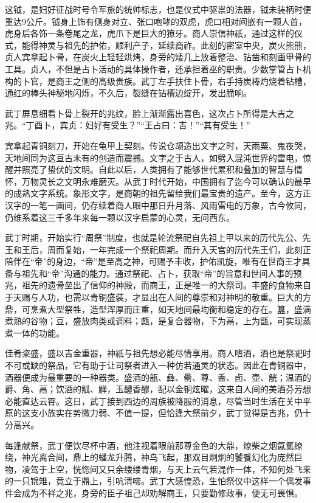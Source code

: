 这钺，是妇好征战时号令军旅的统帅标志，也是仪式中驱祟的法器，钺未装柄时便重达9公斤。钺身上饰有侧身对立、张口咆哮的双虎，虎口相对间嵌有一颗人首，虎身后各饰一条卷尾之龙，虎爪下是巨大的獠牙。商人崇信神祇，通过这样的仪式，能得神灵与祖先的护佑，顺利产子，延续商祚。此刻的密室中央，炭火熊熊，贞人宾拿起卜骨，在炭火上轻轻烘烤，身旁的矮几上放着整治、钻凿和刻画甲骨的工具。贞人，不但是占卜活动的具体操作者，还承担着巫的职责。少数掌管占卜机构的卜官，是商王之侧的高级贵族。武丁左手扶住卜骨，右手持炭棒灼烧着钻槽，通红的棒头神秘地闪烁，不久后，裂缝在钻槽边绽开，发出脆响。

武丁屏息细看卜骨上裂开的兆纹，脸上渐渐露出喜色，这次占卜所得是大吉之兆。“丁酉卜，宾贞：妇好有受生？”“王占曰：吉！”“其有受生！”

宾拿起青铜刻刀，开始在龟甲上契刻。传说仓颉造出文字之时，天雨粟、鬼夜哭，天地间同为这亘古未有的创造而震撼。文字之于古人，如劈入混沌世界的雷电，惊醒并照亮了蛰伏的文明。自此以后，人类拥有了能够世代累积和叠加的智慧与情怀，万物灵长之文明永难磨灭。从武丁时代开始，中国拥有了迄今可以确认的最早的成熟文字系统。象形文字，是商朝的祖先留给我们最宝贵的遗产。至今，这方正汉字的一笔一画间，仍存续着商人眼中那日升月落、风雨雷电的万象，古今攸同，仍维系着这三千多年来每一颗以汉字启蒙的心灵，无问西东。

武丁时期，开始实行“周祭”制度，也就是轮流祭祀自先祖上甲以来的历代先公、先王和王后，周而复始，一年完成一个祭祀周期。而升入天宫的历代先王们，此刻正陪伴在“帝”的身边，“帝”是至高之神，可赐予丰收，护佑凯旋，唯有在世商王才具备与祖先和“帝”沟通的能力。通过祭祀、占卜，获取“帝”的旨意和世间人事的预兆，祖先的遗骨垒出了信仰的神殿，而商王，正是唯一的大祭司。丰盛的食物来自于天赐与人功，也需以青铜盛装，才显出在人间的尊崇和对神明的敬重。巨大的方鼎，可烹煮大型祭牲，造型浑厚而庄重，如天地间最均衡和稳定的存在。簋，盛满煮熟的谷物；豆，盛放肉类或调料；甗，是复合器物，下为鬲，上为甑，可实现蒸煮一体的功能。

佳肴粢盛，盛以吉金重器，神祇与祖先想必能尽情享用。商人嗜酒，酒也是祭祀时不可或缺的祭品，它有助于让司祭者进入一种仿若通灵的状态。因此在青铜器中，酒器便成为最重要的一种器类。盛酒的瓿、彝、罍、尊、盉、卣、壶、觥；温酒的爵、角、鬲；饮酒的觚、觯，玉醴香醪，配以金铜炫曜，这来自人间的美酒芬芳想必能直达云霄。这日，武丁接到西边的周族被降服的消息，尽管当时生活在关中平原的这支小族实在势微力弱、不值一提，但恰逢大祭前夕，武丁觉得是吉兆，仍十分高兴。

每逢献祭，武丁便饮尽杯中酒，他注视着眼前那尊金色的大鼎，燎柴之烟氤氲缭绕，神光离合间，鼎上的蟠龙升腾，神鸟飞起，那双目炯炯的饕餮幻化为庞然巨物，凌驾于上空，恍惚间又只余缕缕青烟，与天上云气若混作一体，不知何处飞来的一只锦雉，竟立于鼎上，引吭清啼。武丁大感惶恐，生怕祭仪中这样一个偶发事件会成为不祥之兆，身旁的臣子祖己却劝解商王，只要勤修政事，便无可畏惧。

